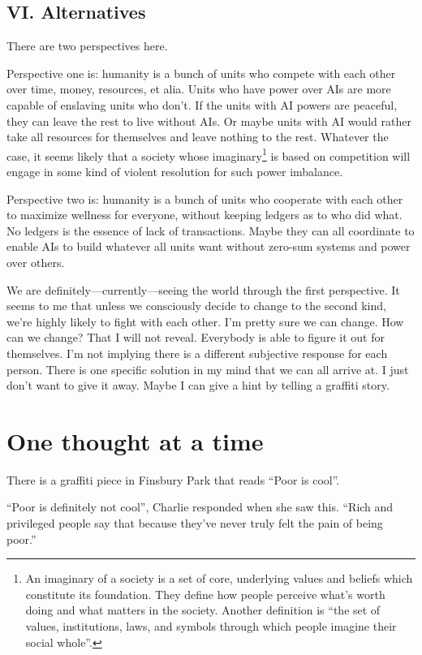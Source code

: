 \subsection{VI. Alternatives}

There are two perspectives here.

Perspective one is: humanity is a bunch of units who compete with each other over time, money, resources, et alia. Units who have power over AIs are more capable of enslaving units who don’t. If the units with AI powers are peaceful, they can leave the rest to live without AIs. Or maybe units with AI would rather take all resources for themselves and leave nothing to the rest. Whatever the case, it seems likely that a society whose imaginary\footnote{An imaginary of a society is a set of core, underlying values and beliefs which constitute its foundation. They define how people perceive what’s worth doing and what matters in the society. Another definition is “the set of values, institutions, laws, and symbols through which people imagine their social whole”.} is based on competition will engage in some kind of violent resolution for such power imbalance.

Perspective two is: humanity is a bunch of units who cooperate with each other to maximize wellness for everyone, without keeping ledgers as to who did what. No ledgers is the essence of lack of transactions. Maybe they can all coordinate to enable AIs to build whatever all units want without zero-sum systems and power over others.

We are definitely—currently—seeing the world through the first perspective. It seems to me that unless we consciously decide to change to the second kind, we’re highly likely to fight with each other. I’m pretty sure we can change. How can we change? That I will not reveal. Everybody is able to figure it out for themselves. I’m not implying there is a different subjective response for each person. There is one specific solution in my mind that we can all arrive at. I just don’t want to give it away. Maybe I can give a hint by telling a graffiti story.

\section{One thought at a time}

There is a graffiti piece in Finsbury Park that reads “Poor is cool”.

“Poor is definitely not cool”, Charlie responded when she saw this. “Rich and privileged people say that because they’ve never truly felt the pain of being poor.”

